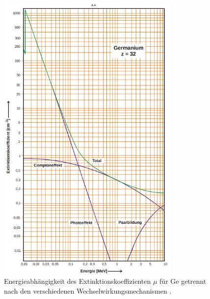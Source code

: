 \begin{figure}
\centering
\includegraphics[width = 0.8\textwidth]{pics/extinktionskoeffizient.png}
\caption{Energieabhängigkeit des Extinktionskoeffizienten $\mu$ für Ge getrennt nach den verschiedenen
Wechselwirkungsmechanismen \cite{anleitungv18}.}
\label{fig:extinktionskoeffizient}
\end{figure}
